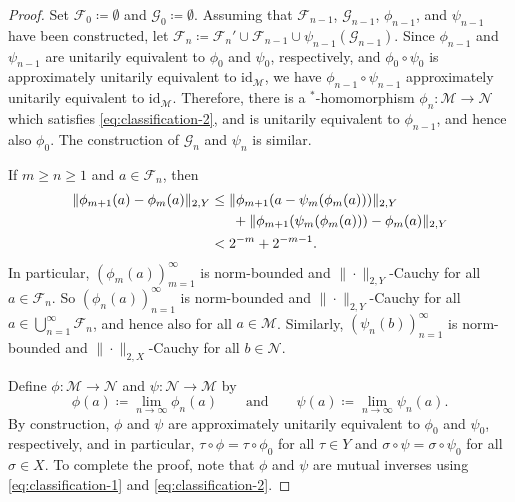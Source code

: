 \documentclass[a4paper,11pt]{amsart}
\theoremstyle{definition}
\numberwithin{equation}{section}
\numberwithin{theorem}{section}
\begin{document}
\begin{proof}
	Set $\mathcal F_0 \coloneqq \emptyset$ and $\mathcal G_0 \coloneqq \emptyset$.  Assuming that $\mathcal F_{n-1}$, $\mathcal G_{n-1}$, $\phi_{n-1}$, and $\psi_{n-1}$ have been constructed, let $\mathcal F_n \coloneqq \mathcal F_n' \cup \mathcal F_{n-1} \cup \psi_{n-1}(\mathcal G_{n-1})$.  Since $\phi_{n-1}$ and $\psi_{n-1}$ are unitarily equivalent to $\phi_0$ and $\psi_0$, respectively, and $\phi_0 \circ \psi_0$ is approximately unitarily equivalent to $\mathrm{id}_\mathcal M$, we have $\phi_{n-1} \circ \psi_{n-1}$ approximately unitarily equivalent to $\mathrm{id}_\mathcal M$.  Therefore, there is a $^*$-homomorphism $\phi_n \colon \mathcal M \rightarrow \mathcal N$ which satisfies \eqref{eq:classification-2}, and is unitarily equivalent to $\phi_{n-1}$, and hence also $\phi_0$.  The construction of $\mathcal G_n$ and $\psi_n$ is similar.
	
	If $m \geq n \geq 1$ and $a \in \mathcal F_n$, then 
	\begin{equation}\begin{split}
		\|\phi_{m+1}(a) - \phi_m(a) \|_{2, Y} &\leq \|\phi_{m+1}(a - \psi_m(\phi_m(a)))\|_{2, Y}  \\
		&\hphantom{==} + \| \phi_{m+1}(\psi_m(\phi_m(a))) - \phi_m(a)\|_{2, Y}  \\
		&< 2^{-m} + 2^{-m-1}.
	\end{split}\end{equation}
	In particular, $(\phi_m(a))_{m=1}^\infty$ is norm-bounded and $\|\cdot\|_{2,Y}$-Cauchy for all $a \in \mathcal F_n$.  So $(\phi_n(a))_{n=1}^\infty$ is norm-bounded and $\|\cdot\|_{2,Y}$-Cauchy for all $a \in \bigcup_{n=1}^\infty \mathcal F_n$, and hence also for all $a\in \mathcal M$.  Similarly, $(\psi_n(b))_{n=1}^\infty$ is norm-bounded and $\|\cdot\|_{2,X}$-Cauchy for all $b \in \mathcal N$.
	
	Define $\phi \colon \mathcal M \rightarrow \mathcal N$ and $\psi \colon \mathcal N \rightarrow \mathcal M$ by 
	\begin{equation}
		\phi(a) \coloneqq \lim_{n \rightarrow \infty} \phi_n(a) \qquad \text{and} \qquad \psi(a) \coloneqq \lim_{n \rightarrow \infty} \psi_n(a).
	\end{equation}
	By construction, $\phi$ and $\psi$ are approximately unitarily equivalent to $\phi_0$ and $\psi_0$, respectively, and in particular, $\tau \circ \phi = \tau \circ \phi_0$ for all $\tau \in Y$ and $\sigma \circ \psi = \sigma \circ \psi_0$ for all $\sigma \in X$.  To complete the proof, note that $\phi$ and $\psi$ are mutual inverses using \eqref{eq:classification-1} and \eqref{eq:classification-2}.
\end{proof}
\end{document}
